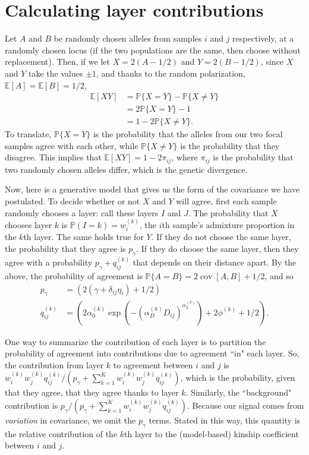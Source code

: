 \documentclass[10pt,letterpaper]{article}
\renewcommand{\P}{\mathbb{P}}
\newcommand{\E}{\mathbb{E}}
\newcommand{\cov}{\mathop{\mbox{cov}}}
\begin{document}
\newpage
\section*{Calculating layer contributions}\label{layer_contribution}

Let $A$ and $B$ be randomly chosen alleles from samples $i$ and $j$ respectively,
at a randomly chosen locus 
(if the two populations are the same, then choose without replacement).
Then, if we let $X=2(A-1/2)$ and $Y=2(B-1/2)$,
since $X$ and $Y$ take the values $\pm 1$,
and thanks to the random polarization, $\E[A] = \E[B] = 1/2$,
$$\begin{aligned}
\E[XY]
        &= \P\{ X=Y \} - \P\{ X \neq Y \} \\
        &= 2 \P\{ X=Y \} - 1 \\
        &= 1 - 2 \P\{ X \neq Y \} .
\end{aligned}$$
To translate, $\P\{ X=Y \}$ is the probability that the alleles from our two focal samples agree with each other,
while $\P\{ X \neq Y \}$ is the probability that they disagree.
This implies that $\E[XY] = 1 - 2 \pi_{ij}$, 
where $\pi_{ij}$ is the probability that two randomly chosen alleles differ, 
which is the genetic divergence.

Now, here is a generative model that gives us the form of the covariance we have postulated.
To decide whether or not $X$ and $Y$ will agree,
first each sample randomly chooses a layer: call these layers $I$ and $J$.
The probability that $X$ chooses layer $k$ is $\P({I=k})=w_i^{(k)}$, 
the $i$th sample's admixture proportion in the $k$th layer.
The same holds true for $Y$.
If they do not choose the same layer, the probability that they agree is $p_\gamma$.
If they do choose the same layer, 
then they agree with a probability $p_\gamma + q^{(k)}_{ij}$ that depends on their distance apart.
By the above,
the probability of agreement is $\P\{A=B\} = 2 \cov[A,B] + 1/2$,
and so
$$\begin{aligned}
    p_\gamma &= (2 (\gamma + \delta_{ij} \eta_i) + 1/2) \\
    q^{(k)}_{ij} &= \left(2 \alpha_0^{(k)} \exp\left( - \left(\alpha_D^{(k)} D_{ij}\right)^{\alpha_2^{(k)}} \right) + 2 \phi^{(k)}  + 1/2 \right) .
\end{aligned}$$

One way to summarize the contribution of each layer is to partition the probability of agreement
into contributions due to agreement ``in" each layer.
So, the contribution from layer $k$ to agreement between $i$ and $j$ is 
$w_i^{(k)} w_j^{(k)} q^{(k)}_{ij} / (p_\gamma + \sum_{k=1}^K w_i^{(k)} w_j^{(k)} q^{(k)}_{ij})$,
which is the probability, given that they agree, that they agree thanks to layer $k$.
Similarly, the ``background" contribution is $p_\gamma / (p_\gamma + \sum_{k=1}^K w_i^{(k)} w_j^{(k)} q^{(k)}_{ij})$.
Because our signal comes from \emph{variation} in covariance, we omit
the $p_\gamma$ terms. 
Stated in this way, this quantity is the
relative contribution of the $k$th layer to the (model-based) kinship
coefficient between $i$ and $j$.
\end{document}

